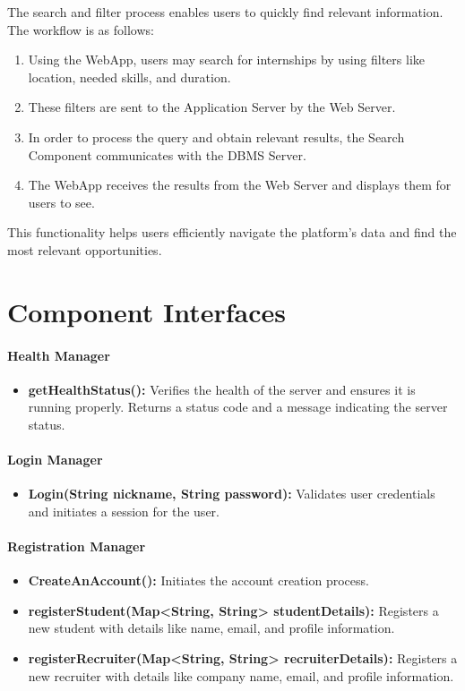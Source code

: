 The search and filter process enables users to quickly find relevant information. The workflow is as follows:
\begin{enumerate}
    \item Using the WebApp, users may search for internships by using filters like location, needed skills, and duration.
    \item These filters are sent to the Application Server by the Web Server.
    \item In order to process the query and obtain relevant results, the Search Component communicates with the DBMS Server.
    \item The WebApp receives the results from the Web Server and displays them for users to see.
\end{enumerate}
This functionality helps users efficiently navigate the platform's data and find the most relevant opportunities.

\section{Component Interfaces}
\label{subsec:component_interfaces}

\paragraph{Health Manager}
\begin{itemize}
    \item \textbf{getHealthStatus():} Verifies the health of the server and ensures it is running properly. Returns a status code and a message indicating the server status.
\end{itemize}

\paragraph{Login Manager}
\begin{itemize}
    \item \textbf{Login(String nickname, String password):} Validates user credentials and initiates a session for the user.
\end{itemize}

\paragraph{Registration Manager}
\begin{itemize}
    \item \textbf{CreateAnAccount():} Initiates the account creation process.
    \item \textbf{registerStudent(Map<String, String> studentDetails):} Registers a new student with details like name, email, and profile information.
    \item \textbf{registerRecruiter(Map<String, String> recruiterDetails):} Registers a new recruiter with details like company name, email, and profile information.
\end{itemize}

